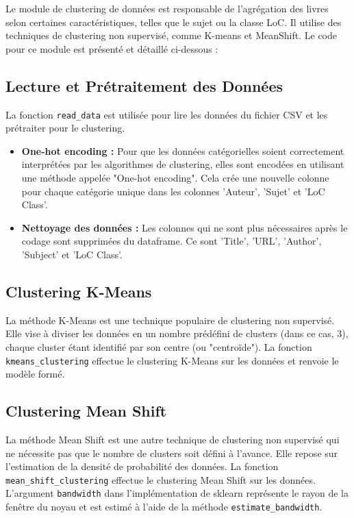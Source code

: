 Le module de clustering de données est responsable de l'agrégation des livres selon certaines caractéristiques, telles que le sujet ou la classe LoC. Il utilise des techniques de clustering non supervisé, comme K-means et MeanShift. Le code pour ce module est présenté et détaillé ci-dessous :

\subsection{Lecture et Prétraitement des Données}
La fonction \texttt{read\_data} est utilisée pour lire les données du fichier CSV et les prétraiter pour le clustering.
\begin{itemize}
    \item \textbf{One-hot encoding :} Pour que les données catégorielles soient correctement interprétées par les algorithmes de clustering, elles sont encodées en utilisant une méthode appelée "One-hot encoding". Cela crée une nouvelle colonne pour chaque catégorie unique dans les colonnes 'Auteur', 'Sujet' et 'LoC Class'.
    \item \textbf{Nettoyage des données :} Les colonnes qui ne sont plus nécessaires après le codage sont supprimées du dataframe. Ce sont 'Title', 'URL', 'Author', 'Subject' et 'LoC Class'.
\end{itemize}

\subsection{Clustering K-Means}
La méthode K-Means est une technique populaire de clustering non supervisé. Elle vise à diviser les données en un nombre prédéfini de clusters (dans ce cas, 3), chaque cluster étant identifié par son centre (ou "centroïde"). La fonction \texttt{kmeans\_clustering} effectue le clustering K-Means sur les données et renvoie le modèle formé.

\subsection{Clustering Mean Shift}
La méthode Mean Shift est une autre technique de clustering non supervisé qui ne nécessite pas que le nombre de clusters soit défini à l'avance. Elle repose sur l'estimation de la densité de probabilité des données. La fonction \texttt{mean\_shift\_clustering} effectue le clustering Mean Shift sur les données. L'argument \texttt{bandwidth} dans l'implémentation de sklearn représente le rayon de la fenêtre du noyau et est estimé à l'aide de la méthode \texttt{estimate\_bandwidth}.

